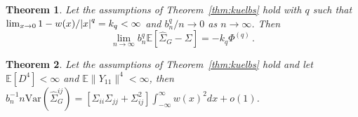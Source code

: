 \documentclass[11pt]{article}
\newcommand{\E}{\mathbb{E}}
\newcommand{\Var}{\text{Var}}
\newtheorem{theorem}{Theorem}
\theoremstyle{remark}
\newtheorem{ass}{Assumption}
\begin{document}


    


\begin{theorem}\label{th:G-SVE_bias}
Let the assumptions of Theorem~\ref{thm:kuelbs} hold with $q$ such that $\lim _{x \to 0}{1 - w(x)}/\abs{x}^q = k_q < \infty$ and $b_n^q/n \to 0$ as $n \to \infty$. Then
\[
 \lim_{n \to \infty}b_n^q\mathbb{E} \left[\hat{\Sigma}_{G} - \Sigma \right] = -k_q\Phi^{(q)}\,.
 \]
\end{theorem}

\begin{theorem} \label{th:G-SVE_variance}
 Let the assumptions of Theorem~\ref{thm:kuelbs} hold and let $\E[D^4] < \infty$  and  $\E \|Y_{11}\|^4 < \infty$, then $b_n^{-1}{n}\Var \left(\hat{\Sigma}_{G}^{ij} \right) = [\Sigma_{ii}\Sigma_{jj} + \Sigma_{ij}^2]\int_{-\infty}^{\infty}w(x)^2dx  + o(1)$.
\end{theorem}

\end{document}
